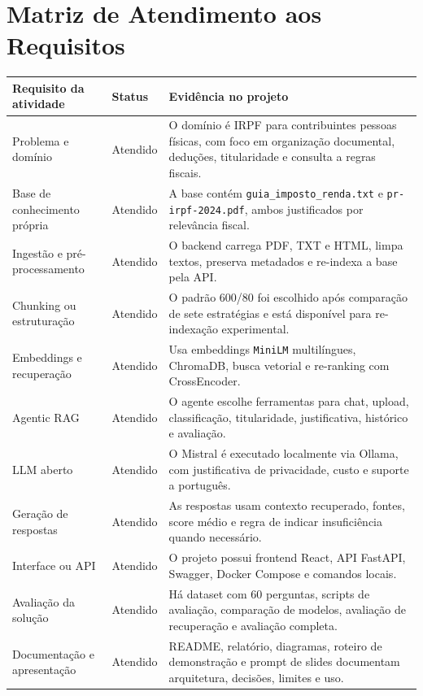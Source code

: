 \documentclass[11pt,a4paper,oneside]{article}
\begin{document}
\section{Matriz de Atendimento aos Requisitos}

\begin{longtable}{@{}L{44mm}L{24mm}L{88mm}@{}}
\toprule
\textbf{Requisito da atividade} & \textbf{Status} & \textbf{Evidência no projeto} \\
\midrule
\endhead
Problema e domínio & Atendido & O domínio é IRPF para contribuintes pessoas físicas, com foco em organização documental, deduções, titularidade e consulta a regras fiscais. \\
Base de conhecimento própria & Atendido & A base contém \texttt{guia\_imposto\_renda.txt} e \texttt{pr-irpf-2024.pdf}, ambos justificados por relevância fiscal. \\
Ingestão e pré-processamento & Atendido & O backend carrega PDF, TXT e HTML, limpa textos, preserva metadados e re-indexa a base pela API. \\
Chunking ou estruturação & Atendido & O padrão 600/80 foi escolhido após comparação de sete estratégias e está disponível para re-indexação experimental. \\
Embeddings e recuperação & Atendido & Usa embeddings \texttt{MiniLM} multilíngues, ChromaDB, busca vetorial e re-ranking com CrossEncoder. \\
Agentic RAG & Atendido & O agente escolhe ferramentas para chat, upload, classificação, titularidade, justificativa, histórico e avaliação. \\
LLM aberto & Atendido & O Mistral é executado localmente via Ollama, com justificativa de privacidade, custo e suporte a português. \\
Geração de respostas & Atendido & As respostas usam contexto recuperado, fontes, score médio e regra de indicar insuficiência quando necessário. \\
Interface ou API & Atendido & O projeto possui frontend React, API FastAPI, Swagger, Docker Compose e comandos locais. \\
Avaliação da solução & Atendido & Há dataset com 60 perguntas, scripts de avaliação, comparação de modelos, avaliação de recuperação e avaliação completa. \\
Documentação e apresentação & Atendido & README, relatório, diagramas, roteiro de demonstração e prompt de slides documentam arquitetura, decisões, limites e uso. \\
\bottomrule
\end{longtable}
\end{document}

